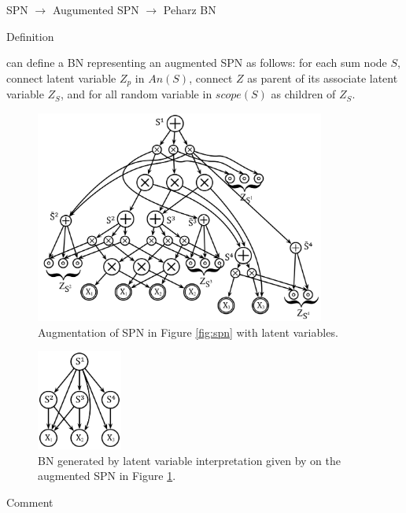 SPN $\rightarrow$ Augumented SPN $\rightarrow$ Peharz BN

Definition

\cite{peharz2013greedy} can define a BN representing an augmented SPN as follows:
for each sum node $S$, connect latent variable $Z_p$ in $An(S)$, connect $Z$ as parent of its associate latent variable $Z_S$, and for all random variable in $scope(S)$ as children of $Z_S$.

\begin{figure}[h]
    \begin{center}
		\includegraphics[width=0.85\textwidth]{figures/aug_SPN.png}
		\caption{Augmentation of SPN in Figure \ref{fig:spn} with latent variables.}
	\label{fig:aug_spn}
    \end{center}
\end{figure}

\begin{figure}[h]
    \begin{center}
		\includegraphics[width=0.25\textwidth]{figures/bn_peharz.png}
		\caption{BN generated by latent variable interpretation given by \cite{peharz2015theoretical} on the augmented SPN in Figure \ref{fig:aug_spn}.}
		\label{fig:bn_poupart}
    \end{center}
\end{figure}

Comment